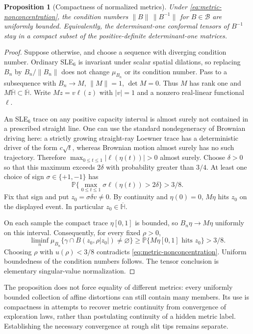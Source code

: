 \documentclass[11pt]{article}
\newtheorem{proposition}[theorem]{Proposition}
\theoremstyle{definition}\newtheorem{definition}[theorem]{Definition}
\theoremstyle{remark}\newtheorem{remark}[theorem]{Remark}
\begin{document}
\begin{proposition}[Compactness of normalized metrics]
\label{prop:rsw-metric-compact}
Under \eqref{eq:metric-nonconcentration}, the condition numbers
$\|B\|\,\|B^{-1}\|$ for $B\in\mathcal B$ are uniformly bounded.
Equivalently, the determinant-one conformal tensors of $B^{-1}$ stay
in a compact subset of the positive-definite determinant-one matrices.
\end{proposition}
\begin{proof}
Suppose otherwise, and choose a sequence with diverging condition number.
Ordinary SLE$_6$ is invariant under scalar spatial dilations, so replacing
$B_n$ by $B_n/\|B_n\|$ does not change $\mu_{B_n}$ or its condition number.
Pass to a subsequence with $B_n\to M$, $\|M\|=1$, $\det M=0$.
Thus $M$ has rank one and $M\overline{\mathbb H}\subset
\overline{\mathbb H}$. Write $M z=v\ell(z)$ with $|v|=1$ and a nonzero
real-linear functional $\ell$.

An SLE$_6$ trace on any positive capacity interval is almost surely not
contained in a prescribed straight line. One can use the standard
nondegeneracy of Brownian driving here: a strictly growing straight-ray
Loewner trace has a deterministic driver of the form $c\sqrt t$, whereas
Brownian motion almost surely has no such trajectory. Therefore
$\max_{0\leq t\leq1}|\ell(\eta(t))|>0$ almost surely. Choose $\delta>0$
so that this maximum exceeds $2\delta$ with probability greater than
$3/4$. At least one choice of sign $\sigma\in\{+1,-1\}$ has
\[
 \mathbb P\{\max_{0\leq t\leq1}\sigma\ell(\eta(t))>2\delta\}>3/8.
\]
Fix that sign and put $z_0=\sigma\delta v\ne0$. By continuity and
$\eta(0)=0$, $M\eta$ hits $z_0$ on the displayed event. In particular
$z_0\in\overline{\mathbb H}$.

On each sample the compact trace $\eta[0,1]$ is bounded, so
$B_n\eta\to M\eta$ uniformly on this interval. Consequently, for every
fixed $\rho>0$,
\[
 \liminf_n\mu_{B_n}\{\gamma\cap B(z_0,\rho|z_0|)\ne\varnothing\}
 \geq \mathbb P\{M\eta[0,1]\text{ hits }z_0\}>3/8.
\]
Choosing $\rho$ with $u(\rho)<3/8$ contradicts
\eqref{eq:metric-nonconcentration}. Uniform boundedness of the condition
numbers follows. The tensor conclusion is elementary singular-value
normalization.
\end{proof}

The proposition does not force equality of different metrics: every
uniformly bounded collection of affine distortions can still contain many
members. Its use is compactness in attempts to recover metric continuity
from convergence of exploration laws, rather than postulating continuity
of a hidden metric label. Establishing the necessary convergence at rough
slit tips remains separate.
\end{document}
